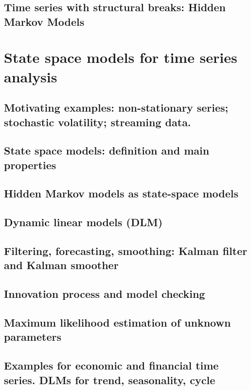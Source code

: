 \documentclass[usenames,dvipsnames,12pt]{book}
\begin{document}
    \chapter[Hidden Markov Models]{Time series with structural breaks: Hidden Markov Models}
    
\part{State space models for time series analysis}

    \chapter[Non-stationary series; stochastic volatility; streaming data]{Motivating examples: non-stationary series; stochastic volatility; streaming data.}

    \chapter[State space models]{State space models: definition and main properties}

    \chapter{Hidden Markov models as state-space models}

    \chapter{Dynamic linear models (DLM)}

    \chapter[Kalman filter and Kalman smoother]{Filtering, forecasting, smoothing: Kalman filter and Kalman smoother}

    \chapter{Innovation process and model checking}

    \chapter[MLE of unknown parameter]{Maximum likelihood estimation of unknown parameters}

    \chapter[DLMs for trend, seasonality, cycle]{Examples for economic and financial time series. DLMs for trend, seasonality, cycle}
\end{document}

